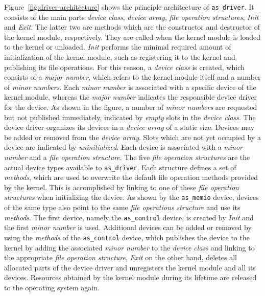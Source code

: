 Figure~\ref{fig:driver-architecture} shows the principle architecture of \texttt{as\_driver}.
It consists of the main parts \textit{device class}, \textit{device array}, \textit{file operation structures}, \textit{Init} and \textit{Exit}.
The latter two are methods which are the constructor and destructor of the kernel module, respectively.
They are called when the kernel module is loaded to the kernel or unloaded.
\textit{Init} performs the minimal required amount of initialization of the kernel module, such as registering it to the kernel and publishing its file operations.
For this reason, a \textit{device class} is created, which consists of a \textit{major number}, which refers to the kernel module itself and a number of \textit{minor numbers}.
Each \textit{minor number} is associated with a specific device of the kernel module, whereas the \textit{major number} indicates the responsible device driver for the device.
As shown in the figure, a number of \textit{minor numbers} are requested but not published immediately, indicated by \textit{empty} slots in the \textit{device class}.
The \asterics device driver organizes its devices in a \textit{device array} of a static size.
Devices may be added or removed from the \textit{device array}.
Slots which are not yet occupied by a device are indicated by \textit{uninitialized}.
Each device is associated with a \textit{minor number} and a \textit{file operation structure}.
The five \textit{file operation structures} are the actual device types available to \texttt{as\_driver}.
Each structure defines a set of \textit{methods}, which are used to overwrite the default file operation methods provided by the kernel.
This is accomplished by linking to one of these \textit{file operation structures} when initializing the device.
As shown by the \texttt{as\_memio} device, devices of the same type also point to the same \textit{file operations structure} and use its \textit{methods}.
The first device, namely the \texttt{as\_control} device, is created by \textit{Init} and the first \textit{minor number} is used.
Additional devices can be added or removed by using the \textit{methods} of the \texttt{as\_control} device, which publishes the device to the kernel by adding the associated \textit{minor number} to the \textit{device class} and linking to the appropriate \textit{file operation structure}.
\textit{Exit} on the other hand, deletes all allocated parts of the \asterics device driver and unregisters the kernel module and all its devices.
Resources obtained by the kernel module during its lifetime are released to the operating system again.

